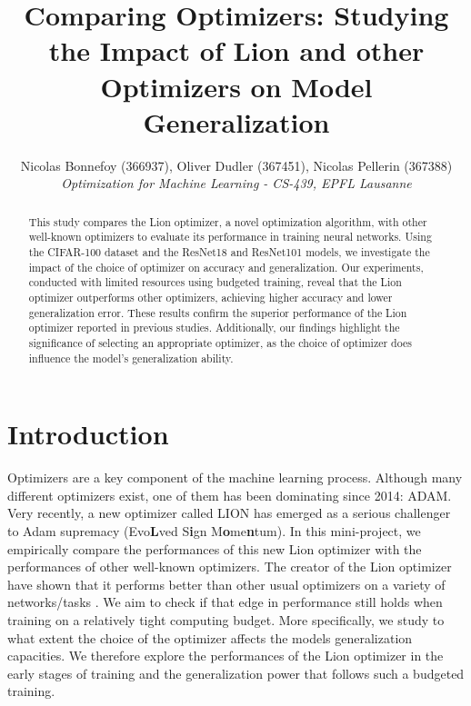 \documentclass[10pt,conference,compsocconf]{IEEEtran}
\begin{document}
\title{Comparing Optimizers: Studying the Impact of Lion and other Optimizers on Model Generalization}


\author{
  Nicolas Bonnefoy (366937), Oliver Dudler (367451), Nicolas Pellerin (367388)\\
  \textit{Optimization for Machine Learning - CS-439, EPFL Lausanne}
}

\maketitle

\begin{abstract}

  This study compares the Lion optimizer, a novel optimization algorithm, with other well-known optimizers to evaluate its performance in training neural networks. Using the CIFAR-100 dataset and the ResNet18 and ResNet101 models, we investigate the impact of the choice of optimizer on accuracy and generalization. Our experiments, conducted with limited resources using budgeted training, reveal that the Lion optimizer outperforms other optimizers, achieving higher accuracy and lower generalization error. These results confirm the superior performance of the Lion optimizer reported in previous studies. Additionally, our findings highlight the significance of selecting an appropriate optimizer, as the choice of optimizer does influence the model's generalization ability.

\end{abstract}

\section{Introduction}
Optimizers are a key component of the machine learning process. Although many different optimizers exist, one of them has been dominating since 2014: ADAM. Very recently, a new optimizer called LION has emerged as a serious challenger to Adam supremacy \cite{lion} (Evo\textbf{L}ved S\textbf{i}gn M\textbf{o}me\textbf{n}tum). In this mini-project, we empirically compare the performances of this new Lion optimizer with the performances of other well-known optimizers. The creator of the Lion optimizer have shown that it performs better than other usual optimizers on a variety of networks/tasks \cite{lion}. We aim to check if that edge in performance still holds when training on a relatively tight computing budget. More specifically, we study to what extent the choice of the optimizer affects the models generalization capacities. We therefore explore the performances of the Lion optimizer in the early stages of training and the generalization power that follows such a budgeted training.
\end{document}
